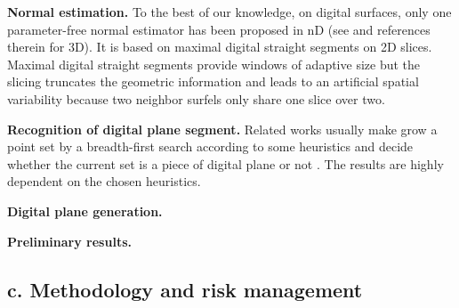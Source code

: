 

\noindent\textbf{Normal estimation.}
To the best of our knowledge, on digital surfaces, only one parameter-free normal estimator has been proposed in nD (see \cite{Lachaud2003} and references therein for 3D). It is based on maximal digital straight segments on 2D slices. Maximal digital straight segments provide windows of adaptive size but the slicing truncates the geometric information and leads to an artificial spatial variability because two neighbor surfels only share one slice over two.

\noindent\textbf{Recognition of digital plane segment.}
Related works usually make grow a point set by a breadth-first search according to some heuristics and decide whether the current set is a piece of digital plane or not \cite{Sivignon2004,Charrier2011}. The results are highly dependent on the chosen heuristics.   


\noindent\textbf{Digital plane generation.}


\noindent\textbf{Preliminary results.}

\subsection{c. Methodology and risk management}

